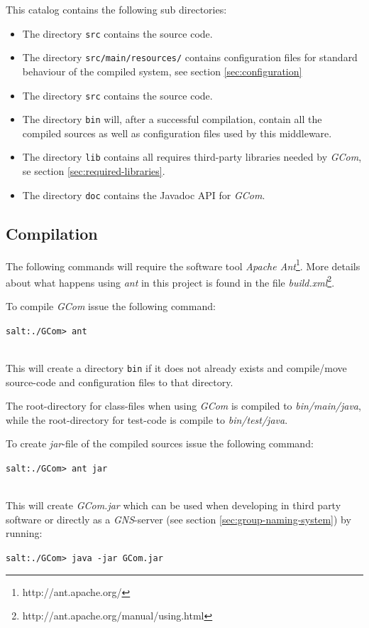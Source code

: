 \documentclass[titlepage, twocolumn, a4paper, 10pt]{article}
\begin{document}
This catalog contains the following sub directories:
\begin{itemize}
\item The directory \verb!src! contains the source code.
\item The directory \verb!src/main/resources/! contains configuration
  files for standard behaviour of the compiled system, see section
  \ref{sec:configuration}
\item The directory \verb!src! contains the source code.
\item The directory \verb!bin! will, after a successful compilation,
  contain all the compiled sources as well as configuration files used
  by this middleware.
\item The directory \verb!lib! contains all requires third-party libraries
  needed by \textit{GCom}, se section \ref{sec:required-libraries}.
\item The directory \verb!doc! contains the Javadoc API for \textit{GCom}.
\end{itemize}

\subsection{Compilation}\label{sec:compilation}
The following commands will require the software tool \textit{Apache
  Ant}\footnote{http://ant.apache.org/}. More details about what
happens using \textit{ant} in this project is found in the file
\textit{build.xml}\footnote{http://ant.apache.org/manual/using.html}.

To compile \textit{GCom} issue the following command:\\
\begin{footnotesize}
  \verb!salt:./GCom> ant!
\end{footnotesize}\\
This will create a directory \verb!bin! if it does not already exists
and compile/move source-code and configuration files to that
directory.

The root-directory for class-files when using \textit{GCom} is
compiled to \textit{bin/main/java}, while the root-directory for
test-code is compile to \textit{bin/test/java}.

To create \textit{jar}-file of the compiled sources issue the
following command:\\
\begin{footnotesize}
  \verb!salt:./GCom> ant jar!
\end{footnotesize}\\
This will create \textit{GCom.jar} which can be used when developing
in third party software or directly as a \textit{GNS}-server (see
section \ref{sec:group-naming-system}) by
running:\\
\begin{footnotesize}
  \verb!salt:./GCom> java -jar GCom.jar!
\end{footnotesize}
\end{document}
